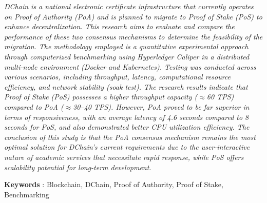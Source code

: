 \textit{
    DChain is a national electronic certificate infrastructure that currently operates on Proof of Authority (PoA) and is planned to migrate to Proof of Stake (PoS) to enhance decentralization. This research aims to evaluate and compare the performance of these two consensus mechanisms to determine the feasibility of the migration. The methodology employed is a quantitative experimental approach through computerized benchmarking using Hyperledger Caliper in a distributed multi-node environment (Docker and Kubernetes). Testing was conducted across various scenarios, including throughput, latency, computational resource efficiency, and network stability (soak test). The research results indicate that Proof of Stake (PoS) possesses a higher throughput capacity ($\approx$60 TPS) compared to PoA ($\approx$30--40 TPS). However, PoA proved to be far superior in terms of responsiveness, with an average latency of 4.6 seconds compared to 8 seconds for PoS, and also demonstrated better CPU utilization efficiency. The conclusion of this study is that the PoA consensus mechanism remains the most optimal solution for DChain's current requirements due to the user-interactive nature of academic services that necessitate rapid response, while PoS offers scalability potential for long-term development.
}

\vspace{1cm}

\noindent\textbf{Keywords} : Blockchain, DChain, Proof of Authority, Proof of Stake, Benchmarking